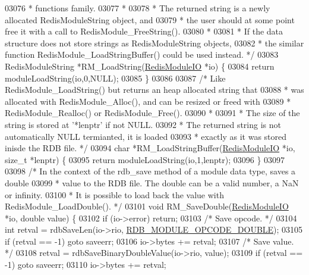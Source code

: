 \begin{DoxyCode}
{{{{{03076 \textcolor{comment}{ * functions family.}
03077 \textcolor{comment}{ *}
03078 \textcolor{comment}{ * The returned string is a newly allocated RedisModuleString object, and}
03079 \textcolor{comment}{ * the user should at some point free it with a call to RedisModule\_FreeString().}
03080 \textcolor{comment}{ *}
03081 \textcolor{comment}{ * If the data structure does not store strings as RedisModuleString objects,}
03082 \textcolor{comment}{ * the similar function RedisModule\_LoadStringBuffer() could be used instead. */}
03083 RedisModuleString *RM\_LoadString(\hyperlink{structRedisModuleIO}{RedisModuleIO} *io) \{
03084     \textcolor{keywordflow}{return} moduleLoadString(io,0,NULL);
03085 \}
03086 
03087 \textcolor{comment}{/* Like RedisModule\_LoadString() but returns an heap allocated string that}
03088 \textcolor{comment}{ * was allocated with RedisModule\_Alloc(), and can be resized or freed with}
03089 \textcolor{comment}{ * RedisModule\_Realloc() or RedisModule\_Free().}
03090 \textcolor{comment}{ *}
03091 \textcolor{comment}{ * The size of the string is stored at '*lenptr' if not NULL.}
03092 \textcolor{comment}{ * The returned string is not automatically NULL termianted, it is loaded}
03093 \textcolor{comment}{ * exactly as it was stored inisde the RDB file. */}
03094 \textcolor{keywordtype}{char} *RM\_LoadStringBuffer(\hyperlink{structRedisModuleIO}{RedisModuleIO} *io, size\_t *lenptr) \{
03095     \textcolor{keywordflow}{return} moduleLoadString(io,1,lenptr);
03096 \}
03097 
03098 \textcolor{comment}{/* In the context of the rdb\_save method of a module data type, saves a double}
03099 \textcolor{comment}{ * value to the RDB file. The double can be a valid number, a NaN or infinity.}
03100 \textcolor{comment}{ * It is possible to load back the value with RedisModule\_LoadDouble(). */}
03101 \textcolor{keywordtype}{void} RM\_SaveDouble(\hyperlink{structRedisModuleIO}{RedisModuleIO} *io, \textcolor{keywordtype}{double} value) \{
03102     \textcolor{keywordflow}{if} (io->error) \textcolor{keywordflow}{return};
03103     \textcolor{comment}{/* Save opcode. */}
03104     \textcolor{keywordtype}{int} retval = rdbSaveLen(io->rio, \hyperlink{rdb_8h_a657fe8be09e7e9b7b4e071da54d2a5f7}{RDB\_MODULE\_OPCODE\_DOUBLE});
03105     \textcolor{keywordflow}{if} (retval == -1) \textcolor{keywordflow}{goto} saveerr;
03106     io->bytes += retval;
03107     \textcolor{comment}{/* Save value. */}
03108     retval = rdbSaveBinaryDoubleValue(io->rio, value);
03109     \textcolor{keywordflow}{if} (retval == -1) \textcolor{keywordflow}{goto} saveerr;
03110     io->bytes += retval;
}}}}}
\end{DoxyCode}
